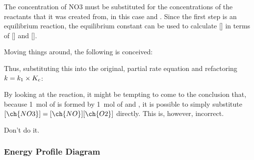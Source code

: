				\mathdiagram{
					\[ R = k\sbs{1}[\ch{NO3}][\ch{NO}] \]
				}

				The concentration of NO3 must be substituted for the concentrations of the reactants that it was created from, in this case
				 and . Since the first step is an equilibrium reaction, the equilibrium constant \Kc can be used to calculate
				[] in terms of [] and [].

				\mathdiagram{
					\[ \MKc = \frac{[\ch{NO3}]}{[\ch{NO}][\ch{O2}]} \]
				}

				\pagebreak
				Moving things around, the following is conceived:

				\mathdiagram{
					\[ [\ch{NO3}] = \MKc[\ch{NO}][\ch{O2}] \]
				}

				Thus, substituting this into the original, partial rate equation and refactoring $k = k_{1} \times K_{c}$:

				\mathdiagram{
					\[ R = k_{1}\MKc[\ch{NO}][\ch{O2}][\ch{NO}] = k[\ch{NO}]^{2}[\ch{O2}]\]
				}


				By looking at the reaction, it might be tempting to come to the conclusion that, because \SI{1}{\mole} of  is formed by
				\SI{1}{\mole} of  and , it is possible to simply substitute $[\ch{NO3}] = [\ch{NO}][\ch{O2}]$ directly.
				This is, however, incorrect.

				Don't do it.



			\subsubsection{Energy Profile Diagram}


